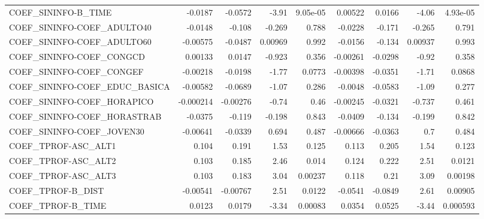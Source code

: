 \begin{tabular}{lrrrrrrrr}
COEF\_SININFO-B\_TIME               &     -0.0187 &      -0.0572 &    -3.91 & 9.05e-05 &    0.00522 &      0.0166 &        -4.06 &      4.93e-05 \\
COEF\_SININFO-COEF\_ADULTO40        &     -0.0148 &       -0.108 &   -0.269 &    0.788 &    -0.0228 &      -0.171 &       -0.265 &         0.791 \\
COEF\_SININFO-COEF\_ADULTO60        &    -0.00575 &      -0.0487 &  0.00969 &    0.992 &    -0.0156 &      -0.134 &      0.00937 &         0.993 \\
COEF\_SININFO-COEF\_CONGCD          &     0.00133 &       0.0147 &   -0.923 &    0.356 &   -0.00261 &     -0.0298 &        -0.92 &         0.358 \\
COEF\_SININFO-COEF\_CONGEF          &    -0.00218 &      -0.0198 &    -1.77 &   0.0773 &   -0.00398 &     -0.0351 &        -1.71 &        0.0868 \\
COEF\_SININFO-COEF\_EDUC\_BASICA     &    -0.00582 &      -0.0689 &    -1.07 &    0.286 &    -0.0048 &     -0.0583 &        -1.09 &         0.277 \\
COEF\_SININFO-COEF\_HORAPICO        &   -0.000214 &     -0.00276 &    -0.74 &     0.46 &   -0.00245 &     -0.0321 &       -0.737 &         0.461 \\
COEF\_SININFO-COEF\_HORASTRAB       &     -0.0375 &       -0.119 &   -0.198 &    0.843 &    -0.0409 &      -0.134 &       -0.199 &         0.842 \\
COEF\_SININFO-COEF\_JOVEN30         &    -0.00641 &      -0.0339 &    0.694 &    0.487 &   -0.00666 &     -0.0363 &          0.7 &         0.484 \\
COEF\_TPROF-ASC\_ALT1               &       0.104 &        0.191 &     1.53 &    0.125 &      0.113 &       0.205 &         1.54 &         0.123 \\
COEF\_TPROF-ASC\_ALT2               &       0.103 &        0.185 &     2.46 &    0.014 &      0.124 &       0.222 &         2.51 &        0.0121 \\
COEF\_TPROF-ASC\_ALT3               &       0.103 &        0.183 &     3.04 &  0.00237 &      0.118 &        0.21 &         3.09 &       0.00198 \\
COEF\_TPROF-B\_DIST                 &    -0.00541 &     -0.00767 &     2.51 &   0.0122 &    -0.0541 &     -0.0849 &         2.61 &       0.00905 \\
COEF\_TPROF-B\_TIME                 &      0.0123 &       0.0179 &    -3.34 &  0.00083 &     0.0354 &      0.0525 &        -3.44 &      0.000593 \\

\end{tabular}
